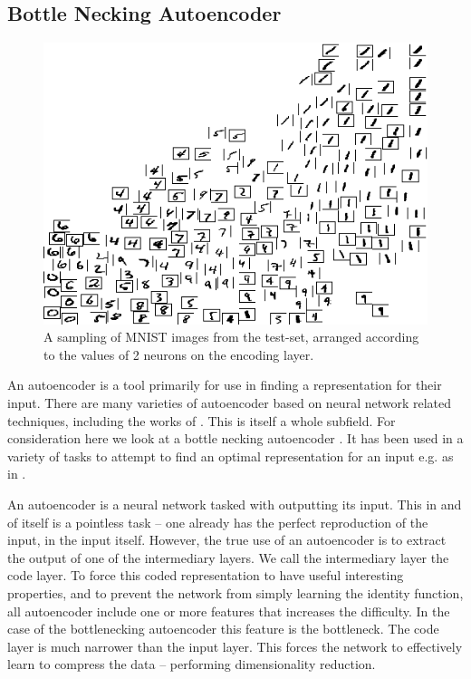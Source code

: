 \documentclass[12pt,parskip]{komatufte}
\begin{document}
\subsection{Bottle Necking Autoencoder}
\begin{figure}
	\caption{A sampling of MNIST images from the test-set, arranged according to the values of 2 neurons on the encoding layer.}
	\label{mnist-encoding}
	\includegraphics[width=\textwidth]{figs/chapterintromachinelearning/mnist-encoding.png}
\end{figure}
An autoencoder is a tool primarily for use in finding a representation for their input.
There are many varieties of autoencoder based on neural network related techniques, including the works of \textcite{hinton2002RBM,hinton2006reducing,hinton2006fastDBN,vincent2010stacked,ICML2012Chen_416,2014VAE}.
This is itself a whole subfield.
For consideration here we look at a bottle necking autoencoder
\parencite{bourlard1988auto,japkowicz2000nonlinear}.
It has been used in a variety of tasks to attempt to find an optimal representation for an input e.g. as in .

An autoencoder is a neural network tasked with outputting its input.
This in and of itself is a pointless task -- one already has the perfect reproduction of the input, in the input itself.
However, the true use of an autoencoder is to extract the output of one of the intermediary layers.
We call the intermediary layer the code layer.
To force this coded representation to have useful interesting properties,
and to prevent the network from simply learning the identity function,
all autoencoder include one or more features that increases the difficulty.
In the case of the bottlenecking autoencoder this feature is the bottleneck.
The code layer is much narrower than the input layer.
This forces the network to effectively learn to compress the data -- performing dimensionality reduction.
\end{document}
